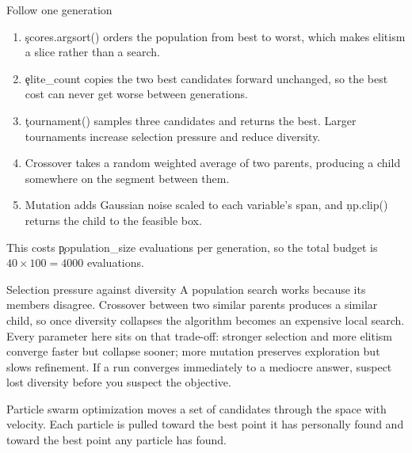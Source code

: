 \begin{SyntaxBox}{Follow one generation}
\begin{enumerate}
    \item \c{scores.argsort()} orders the population from best to worst, which
          makes elitism a slice rather than a search.
    \item \c{elite_count} copies the two best candidates forward unchanged, so
          the best cost can never get worse between generations.
    \item \c{tournament()} samples three candidates and returns the best. Larger
          tournaments increase selection pressure and reduce diversity.
    \item Crossover takes a random weighted average of two parents, producing a
          child somewhere on the segment between them.
    \item Mutation adds Gaussian noise scaled to each variable's span, and
          \c{np.clip()} returns the child to the feasible box.
\end{enumerate}
This costs \c{population_size} evaluations per generation, so the total budget
is $40 \times 100 = 4000$ evaluations.
\end{SyntaxBox}

\begin{ExplainBox}{Selection pressure against diversity}
A population search works because its members disagree. Crossover between two
similar parents produces a similar child, so once diversity collapses the
algorithm becomes an expensive local search. Every parameter here sits on that
trade-off: stronger selection and more elitism converge faster but collapse
sooner; more mutation preserves exploration but slows refinement. If a run
converges immediately to a mediocre answer, suspect lost diversity before you
suspect the objective.
\end{ExplainBox}


Particle swarm optimization moves a set of candidates through the space with
velocity. Each particle is pulled toward the best point it has personally found
and toward the best point any particle has found.

